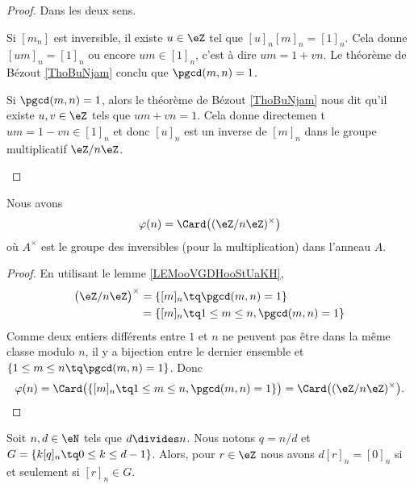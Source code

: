 \begin{proof}
	Dans les deux sens.
	\begin{subproof}
		\spitem[\( \Rightarrow\)]
		Si \( [m_n]\) est inversible, il existe \( u\in \eZ\) tel que \( [u]_n[m]_n=[1]_n\). Cela donne \( [um]_n=[1]_n\) ou encore \( um\in [1]_n\), c'est à dire \( um=1+vn\). Le théorème de Bézout \ref{ThoBuNjam} conclu que \( \pgcd(m,n)=1\).

		\spitem[\( \Leftarrow\)]
		Si \( \pgcd(m,n)=1\), alors le théorème de Bézout \ref{ThoBuNjam} nous dit qu'il existe \( u,v\in \eZ\) tels que \( um+vn=1\). Cela donne directemen t \( um=1-vn\in [1]_n\) et donc \( [u]_n\) est un inverse de \( [m]_n\) dans le groupe multiplicatif \( \eZ/n\eZ\).
	\end{subproof}
\end{proof}

\begin{lemma}		\label{LEMooCLYEooONhWKs}
	Nous avons
	\begin{equation}
		\varphi(n)=\Card\big( (\eZ/n\eZ)^{\times} \big)
	\end{equation}
	où \( A^{\times}\) est le groupe des inversibles (pour la multiplication) dans l'anneau \( A\).
\end{lemma}

\begin{proof}
	En utilisant le lemme \ref{LEMooVGDHooStUaKH},
	\begin{subequations}
		\begin{align}
			\big( \eZ/n\eZ \big)^{\times} & =\{ [m]_n\tq \pgcd(m,n)=1 \}               \\
			                              & =\{ [m]_n\tq 1\leq m\leq n,\pgcd(m,n)=1 \}
		\end{align}
	\end{subequations}
	Comme deux entiers différents entre \( 1 \) et \( n\) ne peuvent pas être dans la même classe modulo \( n\), il y a bijection entre le dernier ensemble et \( \{ 1\leq m\leq n\tq \pgcd(m,n)=1 \}\). Donc
	\begin{equation}
		\varphi(n)=\Card\big( \{ [m]_n\tq 1\leq m\leq n,\pgcd(m,n)=1 \} \big)=\Card\big( (\eZ/n\eZ)^{\times} \big).
	\end{equation}
\end{proof}

\begin{lemma}		\label{LEMooRGIYooRxgyCO}
	Soit \( n,d\in \eN\) tels que \( d\divides n\). Nous notons \( q=n/d\) et \( G=\{ k[q]_n\tq 0\leq k\leq d-1 \}\). Alors, pour \( r\in \eZ\) nous avons \( d[r]_n=[0]_n\) si et seulement si \( [r]_n\in G\).
\end{lemma}

